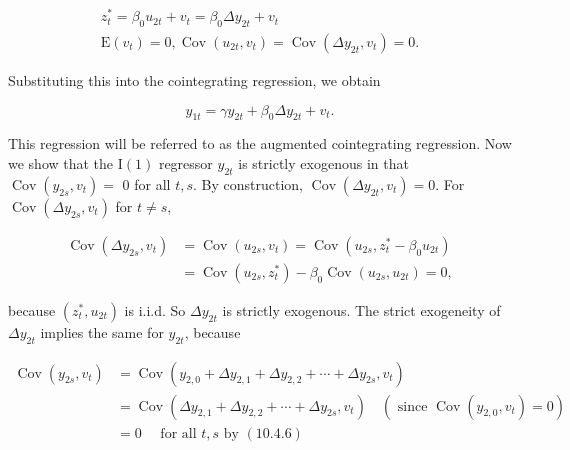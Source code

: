 \documentclass[10pt]{article}
\begin{document}
\begin{gather*}
z_{t}^{*}=\beta_{0} u_{2 t}+v_{t}=\beta_{0} \Delta y_{2 t}+v_{t} \\
\mathrm{E}\left(v_{t}\right)=0, \operatorname{Cov}\left(u_{2 t}, v_{t}\right)=\operatorname{Cov}\left(\Delta y_{2 t}, v_{t}\right)=0 . \tag{10.4.4}
\end{gather*}


Substituting this into the cointegrating regression, we obtain


\begin{equation*}
y_{1 t}=\gamma y_{2 t}+\beta_{0} \Delta y_{2 t}+v_{t} . \tag{10.4.5}
\end{equation*}


This regression will be referred to as the augmented cointegrating regression. Now we show that the $\mathrm{I}(1)$ regressor $y_{2 t}$ is strictly exogenous in that $\operatorname{Cov}\left(y_{2 s}, v_{t}\right)=$ 0 for all $t, s$. By construction, $\operatorname{Cov}\left(\Delta y_{2 t}, v_{t}\right)=0$. For $\operatorname{Cov}\left(\Delta y_{2 s}, v_{t}\right)$ for $t \neq s$,


\begin{align*}
\operatorname{Cov}\left(\Delta y_{2 s}, v_{t}\right) & =\operatorname{Cov}\left(u_{2 s}, v_{t}\right)=\operatorname{Cov}\left(u_{2 s}, z_{t}^{*}-\beta_{0} u_{2 t}\right) \\
& =\operatorname{Cov}\left(u_{2 s}, z_{t}^{*}\right)-\beta_{0} \operatorname{Cov}\left(u_{2 s}, u_{2 t}\right)=0, \tag{10.4.6}
\end{align*}


because $\left(z_{t}^{*}, u_{2 t}\right)$ is i.i.d. So $\Delta y_{2 t}$ is strictly exogenous. The strict exogeneity of $\Delta y_{2 t}$ implies the same for $y_{2 t}$, because


\begin{align*}
\operatorname{Cov}\left(y_{2 s}, v_{t}\right) & =\operatorname{Cov}\left(y_{2,0}+\Delta y_{2,1}+\Delta y_{2,2}+\cdots+\Delta y_{2 s}, v_{t}\right) \\
& =\operatorname{Cov}\left(\Delta y_{2,1}+\Delta y_{2,2}+\cdots+\Delta y_{2 s}, v_{t}\right) \quad\left(\text { since } \operatorname{Cov}\left(y_{2,0}, v_{t}\right)=0\right) \\
& =0 \quad \text { for all } t, s \text { by }(10.4 .6) \tag{10.4.7}
\end{align*}
\end{document}

